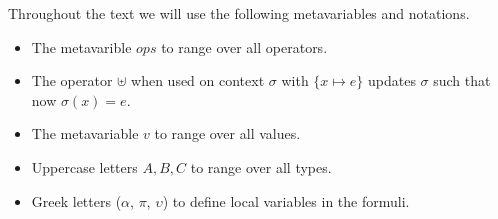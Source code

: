 \documentclass[a4paper,12pt]{report}
\begin{document}
\par
Throughout the text we will use the following metavariables and notations. 
\begin{itemize}
  \item The metavarible $ops$ to range over all operators.
  \item The operator $\uplus$ when used on context $\sigma$ with $\{x \mapsto e\}$ updates $\sigma$ such that now $\sigma(x) = 
e$.
  \item The metavariable $v$ to range over all values.
  \item Uppercase letters $A,B,C$ to range over all types.
  \item Greek letters ($\alpha$, $\pi$, $\upsilon$) to define local variables in 
  the formuli. 
\end{itemize}
\end{document}

